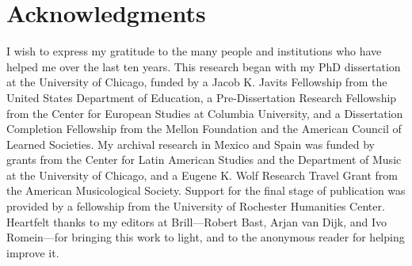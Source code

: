 \chapter{Acknowledgments}
\label{ch:thanks}

I wish to express my gratitude to the many people and institutions who have
helped me over the last ten years.
This research began with my PhD dissertation at the University of Chicago,
funded by a Jacob K. Javits Fellowship from the United States Department of
Education, a Pre-Dissertation Research Fellowship from the Center for European
Studies at Columbia University, and a Dissertation Completion Fellowship from
the Mellon Foundation and the American Council of Learned Societies.
My archival research in Mexico and Spain was funded by grants from the Center
for Latin American Studies and the Department of Music at the University of
Chicago, and a Eugene K. Wolf Research Travel Grant from the American
Musicological Society.
Support for the final stage of publication was provided by a fellowship from
the University of Rochester Humanities Center.
Heartfelt thanks to my editors at Brill---Robert Bast, Arjan van Dijk, and Ivo
Romein---for bringing this work to light, and to the anonymous reader for
helping improve it.

